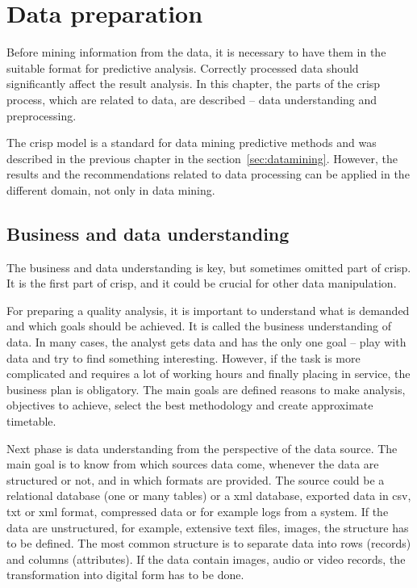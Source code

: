 \documentclass[thesis=M,english]{FITthesis}[2012/10/20]
\begin{document}
\chapter{Data preparation}\label{sec:data}

Before mining information from the data, it is necessary to have them in the suitable format for predictive analysis. Correctly processed data should significantly affect the result analysis. In this chapter, the parts of the \gls{crisp} process, which are related to data, are described  -- data understanding and preprocessing.

The \gls{crisp} model is a standard for data mining predictive methods and was described in the previous chapter in the section~\ref{sec:datamining}. However, the results and the recommendations related to data processing can be applied in the different domain, not only in data mining.  

\section{Business and data understanding}

The business and data understanding is key, but sometimes omitted part of \gls{crisp}. It is the first part of \gls{crisp}, and it could be crucial for other data manipulation. 

For preparing a quality analysis, it is important to understand what is demanded and which goals should be achieved. It is called the business understanding of data. In many cases, the analyst gets data and has the only one goal -- play with data and try to find something interesting. However, if the task is more complicated and requires a lot of working hours and finally placing in service, the business plan is obligatory. The main goals are defined reasons to make analysis, objectives to achieve, select the best methodology and create approximate timetable.\cite[14]{Chapman2000crisp}

Next phase is data understanding from the perspective of the data source. The main goal is to know from which sources data come, whenever the data are structured or not, and in which formats are provided. \cite[18]{Chapman2000crisp} The source could be a relational database (one or many tables) or a \gls{xml} database, exported data in \gls{csv}, \gls{txt} or \gls{xml} format, compressed data or for example logs from a system. If the data are unstructured, for example, extensive text files, images, the structure has to be defined. The most common structure is to separate data into rows (records) and columns (attributes). If the data contain images, audio or video records, the transformation into digital form has to be done. 
\end{document}

